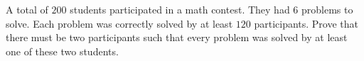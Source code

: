 A total of \(200\) students participated in a math contest.
They had \(6\) problems to solve.
Each problem was correctly solved by at least \(120\) participants.
Prove that there must be two participants such that every problem was solved by at least one of these two students.